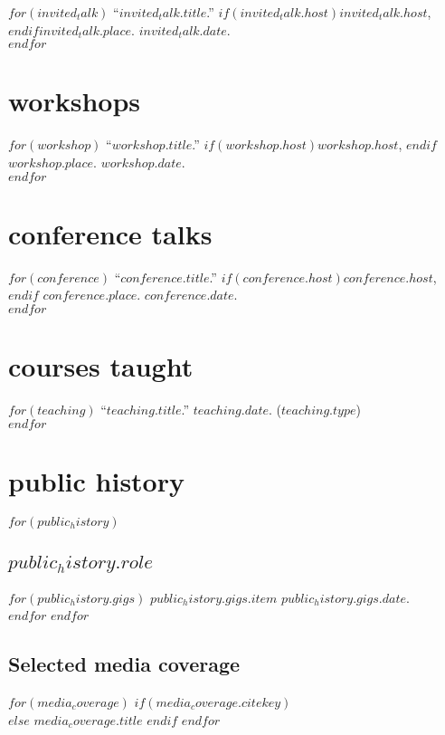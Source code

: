 \documentclass[11pt, a4paper]{article}
\begin{document}
$for(invited_talk)$
``$invited_talk.title$.'' $if(invited_talk.host)$$invited_talk.host$, $endif$$invited_talk.place$. $invited_talk.date$.\\[.15cm]
$endfor$


\section{workshops}

$for(workshop)$
``$workshop.title$.''
$if(workshop.host)$$workshop.host$, $endif$$workshop.place$.
$workshop.date$.\\[.15cm]
$endfor$

\section{conference talks}

$for(conference)$
``$conference.title$.''
$if(conference.host)$$conference.host$, $endif$
$conference.place$.
$conference.date$.\\[.15cm]
$endfor$

\section{courses taught}

$for(teaching)$
``$teaching.title$.'' $teaching.date$. ($teaching.type$)\\[.15cm]
$endfor$


\section{public history}

$for(public_history)$
\subsection{$public_history.role$}
$for(public_history.gigs)$
$public_history.gigs.item$ $public_history.gigs.date$.\\[.15cm]
$endfor$
$endfor$
\subsection{Selected media coverage}

$for(media_coverage)$
$if(media_coverage.citekey)$
\\
$else$
$media_coverage.title$
$endif$
$endfor$
\end{document}
